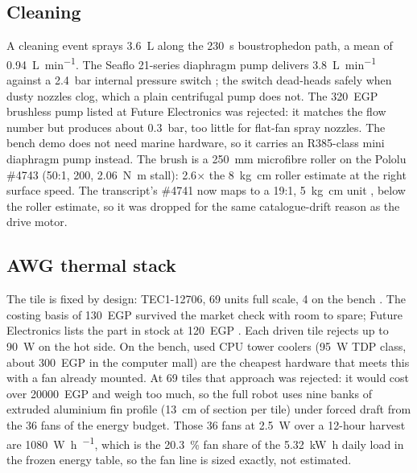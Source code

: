 \documentclass[11pt,a4paper]{article}
\begin{document}
\subsection{Cleaning}
A cleaning event sprays \SI{3.6}{\liter} along the \SI{230}{\second}
boustrophedon path, a mean of \SI{0.94}{\liter\per\minute}. The Seaflo
21-series diaphragm pump delivers \SI{3.8}{\liter\per\minute} against a
\SI{2.4}{\bar} internal pressure switch \cite{seaflo2023pump}; the switch
dead-heads safely when dusty nozzles clog, which a plain centrifugal pump
does not. The \num{320}~EGP brushless pump listed at Future Electronics was
rejected: it matches the flow number but produces about \SI{0.3}{\bar},
too little for flat-fan spray nozzles. The bench demo does not need marine
hardware, so it carries an R385-class mini diaphragm pump instead. The brush
is a \SI{250}{\milli\metre} microfibre roller on the Pololu \#4743 (50:1,
\SI{200}{\rpm}, \SI{2.06}{\newton\metre} stall): 2.6$\times$ the
\SI{8}{\kilogram\centi\metre} roller estimate at the right surface speed. The
transcript's \#4741 now maps to a 19:1, \SI{5}{\kilogram\centi\metre} unit
\cite{pololu4741}, below the roller estimate, so it was dropped for the same
catalogue-drift reason as the drive motor.

\subsection{AWG thermal stack}
The tile is fixed by design: TEC1-12706, 69 units full scale, 4 on the bench
\cite{tec12706ds}. The costing basis of \num{130}~EGP survived the market
check with room to spare; Future Electronics lists the part in stock at
\num{120}~EGP \cite{futelec2026tec}. Each driven tile rejects up to
\SI{90}{\watt} on the hot side. On the bench, used CPU tower coolers
(\SI{95}{\watt} TDP class, about \num{300}~EGP in the computer mall) are the
cheapest hardware that meets this with a fan already mounted. At 69 tiles
that approach was rejected: it would cost over \num{20000}~EGP and weigh too
much, so the full robot uses nine banks of extruded aluminium fin profile
(\SI{13}{\centi\metre} of  section per
tile) under forced draft from the 36 fans of the energy budget. Those 36 fans
at \SI{2.5}{\watt} over a 12-hour harvest are \SI{1080}{\watt\hour\per\dy},
which is the \SI{20.3}{\percent} fan share of the \SI{5.32}{\kilo\watt\hour}
daily load in the frozen energy table, so the fan line is sized exactly, not
estimated.
\end{document}
